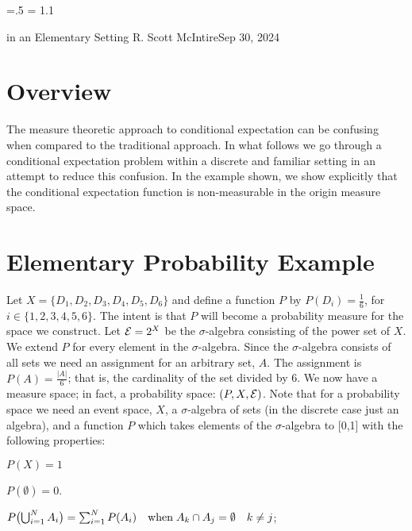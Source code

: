 




\parindent=0pt
\parskip=.5\baselineskip
\baselineskip = 1.1\baselineskip

\footline{\hss\tenrm\folio\hss}

        {in an Elementary Setting}
{R. Scott McIntire}{Sep 30, 2024}

\section{Overview}
The measure theoretic approach to conditional expectation can be confusing
when compared to the traditional approach.
In what follows we go through a conditional 
expectation problem within a discrete and familiar setting in an attempt 
to reduce this confusion. In the example shown, we show explicitly that the 
conditional expectation function is non-measurable in the origin 
measure space.


\section{Elementary Probability Example}
Let $X = \{D_1, D_2, D_3, D_4, D_5, D_6\}$ and define a function $P$ by 
$P(D_i) = \frac{1}{6}$, for $i\in \{1,2,3,4,5,6\}$. The intent is that $P$ will 
become a probability measure for the space we construct.
Let ${\cal E} = 2^X$ be the $\sigma$-algebra 
consisting of the power set of $X$. We extend $P$ for every element in the $\sigma$-algebra.
Since the $\sigma$-algebra consists of all sets 
we need an assignment for an arbitrary set, $A$. 
The assignment is $P(A) = \frac{|A|}{6}$; that is, the cardinality of the set divided by 6.
We now have a measure space; in fact, a probability space: $(P,X,{\cal E})$.
Note that for a probability space we need an event space, $X$, a $\sigma$-algebra of sets 
(in the discrete case just an algebra), and a function $P$ which takes 
elements of the $\sigma$-algebra to [0,1] with the following properties:

\beginEnum
\item{$P(X) = 1$}
\item{$P(\emptyset) = 0$.}
\item{$
P\bigl(\mathop{\bigcup}_{i=1}^N A_i\bigr) = \sum_{i=1}^N P(A_i) 
\quad {\rm when}\;  A_k \cap A_j = \emptyset \quad k\neq j
$;}
\endEnum

